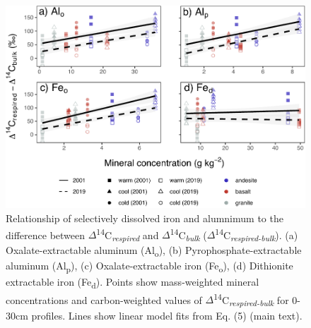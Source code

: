 \documentclass[english,man,floatsintext]{apa6}
\begin{document}
\begin{figure}

{\centering \includegraphics{sra-blk-inc-SI_files/figure-latex/min-all-inc-blk-plot-1} 

}

\caption{Relationship of selectively dissolved iron and alumnimum to the difference between \(\Delta\)\textsuperscript{14}C\textsubscript{\emph{respired}} and \(\Delta\)\textsuperscript{14}C\textsubscript{\emph{bulk}} (\(\Delta\)\textsuperscript{14}C\textsubscript{\emph{respired-bulk}}). (a) Oxalate-extractable aluminum (Al\textsubscript{o}), (b) Pyrophosphate-extractable aluminum (Al\textsubscript{p}), (c) Oxalate-extractable iron (Fe\textsubscript{o}), (d) Dithionite extractable iron (Fe\textsubscript{d}). Points show mass-weighted mineral concentrations and carbon-weighted values of \(\Delta\)\textsuperscript{14}C\textsubscript{\emph{respired-bulk}} for 0-30cm profiles. Lines show linear model fits from Eq. (5) (main text).}\label{fig:min-all-inc-blk-plot}
\end{figure}
\end{document}
